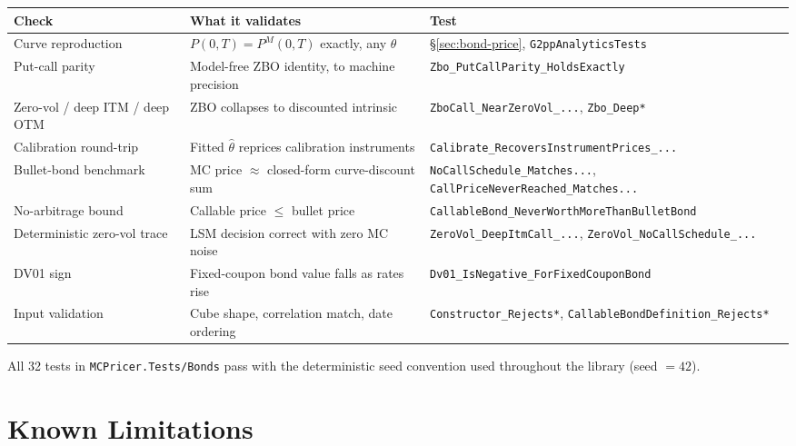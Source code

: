 \documentclass[11pt,a4paper]{article}
\newcommand{\coderef}[1]{\texttt{\color{blue!60!black}#1}}
\theoremstyle{definition}
\begin{document}
\begin{center}
\small
\renewcommand{\arraystretch}{1.3}
\begin{tabular}{@{}p{3.6cm}p{6.2cm}p{5.0cm}@{}}\toprule
\textbf{Check} & \textbf{What it validates} & \textbf{Test}\\\midrule
Curve reproduction & $P(0,T)=P^M(0,T)$ exactly, any $\theta$ &
  \S\ref{sec:bond-price}, \texttt{G2ppAnalyticsTests} \\
Put-call parity & Model-free ZBO identity, to machine precision &
  \texttt{Zbo\_\allowbreak PutCallParity\_\allowbreak HoldsExactly} \\
Zero-vol / deep ITM / deep OTM & ZBO collapses to discounted intrinsic &
  \texttt{ZboCall\_\allowbreak NearZeroVol\_\allowbreak ...}, \texttt{Zbo\_\allowbreak Deep*} \\
Calibration round-trip & Fitted $\hat\theta$ reprices calibration instruments &
  \texttt{Calibrate\_\allowbreak RecoversInstrumentPrices\_\allowbreak ...} \\
Bullet-bond benchmark & MC price $\approx$ closed-form curve-discount sum &
  \texttt{NoCallSchedule\_\allowbreak Matches...}, \texttt{CallPriceNeverReached\_\allowbreak Matches...} \\
No-arbitrage bound & Callable price $\le$ bullet price &
  \texttt{CallableBond\_\allowbreak NeverWorthMoreThanBulletBond} \\
Deterministic zero-vol trace & LSM decision correct with zero MC noise &
  \texttt{ZeroVol\_\allowbreak DeepItmCall\_\allowbreak ...}, \texttt{ZeroVol\_\allowbreak NoCallSchedule\_\allowbreak ...} \\
DV01 sign & Fixed-coupon bond value falls as rates rise &
  \texttt{Dv01\_\allowbreak IsNegative\_\allowbreak ForFixedCouponBond} \\
Input validation & Cube shape, correlation match, date ordering &
  \texttt{Constructor\_\allowbreak Rejects*}, \texttt{CallableBondDefinition\_\allowbreak Rejects*} \\
\bottomrule
\end{tabular}
\end{center}

All 32 tests in \coderef{MCPricer.Tests/Bonds} pass with the deterministic
seed convention used throughout the library (seed $=42$).

\section{Known Limitations}
\label{sec:limitations}
\end{document}
